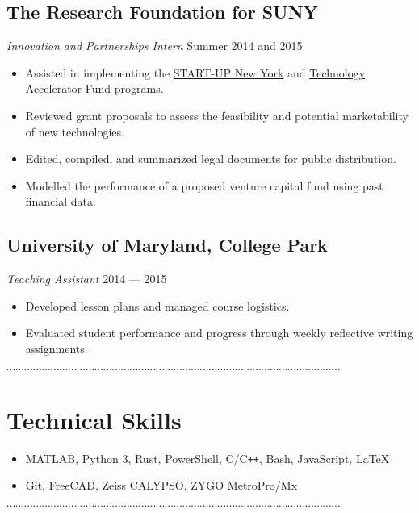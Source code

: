 \documentclass[10pt]{article}
\newcommand{\dotfringe}{
    \begin{center}
      $\cdots\cdots\cdots\cdots\cdots\cdots\cdots\cdots\cdots\cdots\cdots\cdots\cdots\cdots\cdots\cdots\cdots\cdots\cdots\cdots\cdots\cdots\cdots\cdots\cdots\cdots\cdots\cdots\cdots\cdots\cdots\cdots\cdots\cdots\cdots\cdots\cdots\cdots$
    \end{center}
}
\begin{document}
\subsection*{The Research Foundation for SUNY}
\textit{Innovation and Partnerships Intern} \hfill Summer 2014 and 2015
\begin{itemize}
  \item Assisted in implementing the \href{https://esd.ny.gov/startup-ny-program}{START-UP New York} and \href{https://www.rfsuny.org/Our-Work/Innovation-and-Partnerships/Programs/Technology-Accelerator-Fund/}{Technology Accelerator Fund} programs.
  \item Reviewed grant proposals to assess the feasibility and potential marketability of new technologies.
  \item Edited, compiled, and summarized legal documents for public distribution.
  \item Modelled the performance of a proposed venture capital fund using past financial data.
\end{itemize}
\subsection*{University of Maryland, College Park}
\textit{Teaching Assistant} \hfill 2014 --- 2015
\begin{itemize}
  \item Developed lesson plans and managed course logistics.
  \item Evaluated student performance and progress through weekly reflective writing assignments.
\end{itemize}
\dotfringe{}
\section*{Technical Skills}
\begin{itemize}
  \item MATLAB, Python 3, Rust, PowerShell, C/C\texttt{++}, Bash, JavaScript, \LaTeX
  \item Git, FreeCAD, Zeiss CALYPSO, ZYGO MetroPro/Mx
\end{itemize}

\dotfringe{}
\end{document}
